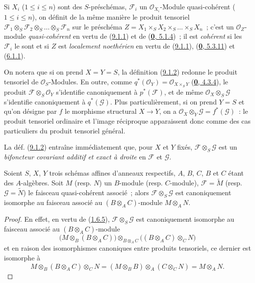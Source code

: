 Si $X_i$ ($1\leq i\leq n$) sont des $S$-préschémas, $\mathscr{F}_i$ un
$\mathscr{O}_{X_i}$-Module quasi-cohérent ($1\leq i\leq n$), on définit de
la même manière le produit tensoriel
$\mathscr{F}_1\otimes_S\mathscr{F}_2\otimes_S\ldots\otimes_S\mathscr{F}_n$
sur le préschéma
$Z=X_1\times_S X_2\times_S\ldots\times_S X_n$~; c'est un
$\mathscr{O}_Z$-module \emph{quasi-cohérent} en vertu de
(\hyperref[I.9.1.1-fr]{9.1.1}) et de
(\hyperref[0.5.1.4-fr]{\textbf{0}, 5.1.4})~; il est \emph{cohérent} si les
$\mathscr{F}_i$ le sont et si $Z$ est \emph{localement noethérien} en vertu
de (\hyperref[I.9.1.1-fr]{9.1.1}),
(\hyperref[0.5.3.11-fr]{\textbf{0}, 5.3.11}) et
(\hyperref[I.6.1.1-fr]{6.1.1}).

On notera que si on prend $X=Y=S$, la définition
(\hyperref[I.9.1.2-fr]{9.1.2}) redonne le produit tensoriel de
$\mathscr{O}_S$-Modules. En outre, comme
$q^*(\mathscr{O}_Y)=\mathscr{O}_{X\times_S Y}$
(\hyperref[0.4.3.4-fr]{\textbf{0}, 4.3.4}), le produit
$\mathscr{F}\otimes_S\mathscr{O}_Y$ s'identifie canoniquement à
$p^*(\mathscr{F})$, et de même
$\mathscr{O}_X\otimes_S\mathscr{G}$ s'identifie canoniquement à
$q^*(\mathscr{G})$. Plus particulièrement, si on prend $Y=S$ et qu'on
désigne par $f$ le morphisme structural $X\to Y$, on a
$\mathscr{O}_X\otimes_Y\mathscr{G}=f^*(\mathscr{G})$~: le produit tensoriel
ordinaire et l'image réciproque apparaissent donc comme des cas particuliers
du produit tensoriel général.

La déf. (\hyperref[I.9.1.2-fr]{9.1.2}) entraîne immédiatement que, pour $X$
et $Y$ fixés, $\mathscr{F}\otimes_S\mathscr{G}$ est un
\emph{bifoncteur covariant additif et exact à droite} en $\mathscr{F}$ et
$\mathscr{G}$.

\begin{proposition}[9.1.3]
\label{I.9.1.3-fr}
Soient $S$, $X$, $Y$ trois schémas affines d'anneaux respectifs, $A$, $B$,
$C$, $B$ et $C$ étant des $A$-algèbres. Soit $M$ \textup{(resp. $N$)} un $B$-module
\textup{(resp.} $C$-module), $\mathscr{F}=\widetilde{M}$ \textup{(resp.}
$\mathscr{G}=\widetilde{N}$) le faisceau quasi-cohérent associé~; alors
$\mathscr{F}\otimes_S\mathscr{G}$ est canoniquement isomorphe au faisceau
associé au $(B\otimes_A C)$-module $M\otimes_A N$.
\end{proposition}

\begin{proof}
En effet, en vertu de (\hyperref[I.1.6.5-fr]{1.6.5}),
$\mathscr{F}\otimes_S\mathscr{G}$ est canoniquement isomorphe au faisceau
associé au $(B\otimes_A C)$-module
\[
  \bigl(M\otimes_B(B\otimes_A C)\bigr)
  \otimes_{B\otimes_A C}
  \bigl((B\otimes_A C)\otimes_C N\bigr)
\]
et en raison des isomorphismes canoniques entre produits tensoriels, ce
dernier est isomorphe à
\[
  M\otimes_B(B\otimes_A C)\otimes_C N
  =(M\otimes_B B)\otimes_A(C\otimes_C N)=M\otimes_A N.
\]
\end{proof}

